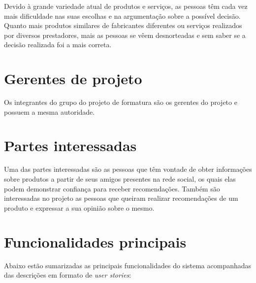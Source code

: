 \documentclass[]{article}
\begin{document}
Devido à grande variedade atual de produtos e serviços, as pessoas têm cada vez mais dificuldade nas suas escolhas e na argumentação sobre a possível decisão. Quanto mais produtos similares de fabricantes diferentes ou serviços realizados por diversos prestadores, mais as pessoas se vêem desnorteadas e sem saber se a decisão realizada foi a mais correta.


\section{Gerentes de projeto}
\label{sec:gerentes_de_projeto}

Os integrantes do grupo do projeto de formatura são os gerentes do projeto e possuem a mesma autoridade.


\section{Partes interessadas}
\label{sec:partes_interessadas}

Uma das partes interessadas são as pessoas que têm vontade de obter informações sobre produtos a partir de seus amigos presentes na rede social, os quais elas podem demonstrar confiança para receber recomendações.
Também são interessadas no projeto as pessoas que queiram realizar recomendações de um produto e expressar a sua opinião sobre o mesmo.


\section{Funcionalidades principais} %
\label{sec:funcionalidades_principais}

Abaixo estão sumarizadas as principais funcionalidades do sistema acompanhadas das descrições em formato de \textit{user stories}:
\end{document}
